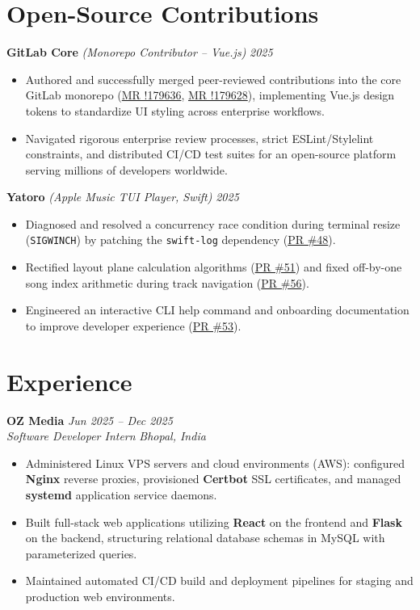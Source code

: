 \documentclass[10pt,a4paper]{article}
\begin{document}
\section{Open-Source Contributions}
\textbf{GitLab Core} \textit{(Monorepo Contributor -- Vue.js)} \hfill \textit{2025}
\begin{itemize}
    \item Authored and successfully merged peer-reviewed contributions into the core GitLab monorepo (\href{https://gitlab.com/gitlab-org/gitlab/-/merge_requests/179636}{MR !179636}, \href{https://gitlab.com/gitlab-org/gitlab/-/merge_requests/179628}{MR !179628}), implementing Vue.js design tokens to standardize UI styling across enterprise workflows.
    \item Navigated rigorous enterprise review processes, strict ESLint/Stylelint constraints, and distributed CI/CD test suites for an open-source platform serving millions of developers worldwide.
\end{itemize}

\textbf{Yatoro} \textit{(Apple Music TUI Player, Swift)} \hfill \textit{2025}
\begin{itemize}
    \item Diagnosed and resolved a concurrency race condition during terminal resize (\texttt{SIGWINCH}) by patching the \texttt{swift-log} dependency (\href{https://github.com/jayadamsmorgan/Yatoro/pull/48}{PR \#48}).
    \item Rectified layout plane calculation algorithms (\href{https://github.com/jayadamsmorgan/Yatoro/pull/51}{PR \#51}) and fixed off-by-one song index arithmetic during track navigation (\href{https://github.com/jayadamsmorgan/Yatoro/pull/56}{PR \#56}).
    \item Engineered an interactive CLI help command and onboarding documentation to improve developer experience (\href{https://github.com/jayadamsmorgan/Yatoro/pull/53}{PR \#53}).
\end{itemize}

\section{Experience}
\textbf{OZ Media} \hfill \textit{Jun 2025 -- Dec 2025} \\
\textit{Software Developer Intern} \hfill \textit{Bhopal, India}
\begin{itemize}
    \item Administered Linux VPS servers and cloud environments (AWS): configured \textbf{Nginx} reverse proxies, provisioned \textbf{Certbot} SSL certificates, and managed \textbf{systemd} application service daemons.
    \item Built full-stack web applications utilizing \textbf{React} on the frontend and \textbf{Flask} on the backend, structuring relational database schemas in MySQL with parameterized queries.
    \item Maintained automated CI/CD build and deployment pipelines for staging and production web environments.
\end{itemize}
\end{document}
